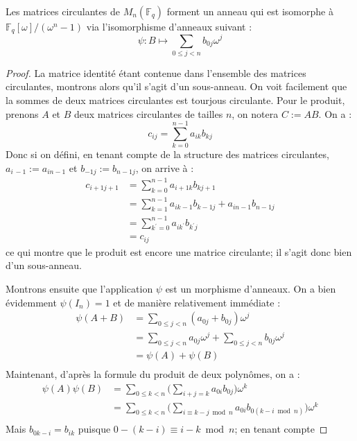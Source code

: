 \documentclass[a4paper]{article} %
\numberwithin{section}{part}
\numberwithin{equation}{section}
\newcommand\GF[1]{\mathbb{F}_{#1}}
\begin{document}
\begin{thm}
\label{th:matcirciso}
Les matrices circulantes de $M_n(\GF{q})$ forment un anneau qui est isomorphe à 
$\mathbb{F}_q[\omega]/(\omega^n - 1)$ \textup{via} l'isomorphisme d'anneaux
suivant :
\begin{equation*}
\label{eq:isomconvert}
\psi : B \longmapsto \sum_{0\leq j < n}{b_{0j}\omega^j}
\end{equation*}
\end{thm}
\begin{proof}
La matrice identité étant contenue dans l'ensemble des matrices circulantes, 
montrons alors qu'il s'agit d'un sous-anneau. On voit facilement que la sommes 
de deux matrices circulantes est tourjous circulante. Pour le produit, prenons 
$A$ et $B$ deux matrices circulantes de tailles $n$, on notera $C := AB$. On a :
\[c_{ij} = \sum_{k=0}^{n-1}{a_{ik}b_{kj}}\]
Donc si on défini, en tenant compte de la structure des matrices circulantes, 
$a_{i\,-1} := a_{in-1}$ et $b_{-1j} := b_{n-1j}$, on arrive à :
\begin{align*}
c_{i+1j+1} &= \sum_{k=0}^{n-1}{a_{i+1k}b_{kj+1}}\\
&= \sum_{k=1}^{n-1}{a_{ik-1}b_{k-1j}} + a_{in-1}b_{n-1j}\\
&= \sum_{k^{\prime}=0}^{n-1}{a_{ik^{\prime}}b_{k^{\prime}j}}\\
&= c_{ij}
\end{align*}
ce qui montre que le produit est encore une matrice circulante; il s'agit donc 
bien d'un sous-anneau.\par
Montrons ensuite que l'application $\psi$ est un morphisme d'anneaux. On a bien 
évidemment $\psi(I_n) = 1$ et de manière relativement immédiate :
\begin{align*}
\psi(A + B) &= \sum_{0\leq j < n}{(a_{0j} + b_{0j})\omega^j}\\
&= \sum_{0\leq j < n}{a_{0j}\omega^j} + \sum_{0\leq j < n}{b_{0j}\omega^j}\\
&= \psi(A) + \psi(B)\\
\end{align*}
Maintenant, d'après la formule du produit de deux polynômes, on a :
\begin{align*}
\psi(A)\psi(B) &= \sum_{0\leq k < n}
{\bigg(\sum_{i+j=k}{a_{0i}b_{0j}}\bigg)\omega^k}\\
&= \sum_{0\leq k < n}{\bigg(\sum_{i\equiv k-j \bmod n}{a_{0i}b_{0(k-i \bmod n)}}
\bigg)\omega^k}\\
\end{align*}
Mais $b_{0k-i} = b_{ik}$ puisque $0 -(k-i) \equiv i-k \bmod n$; en tenant compte

\end{proof}
\end{document}
